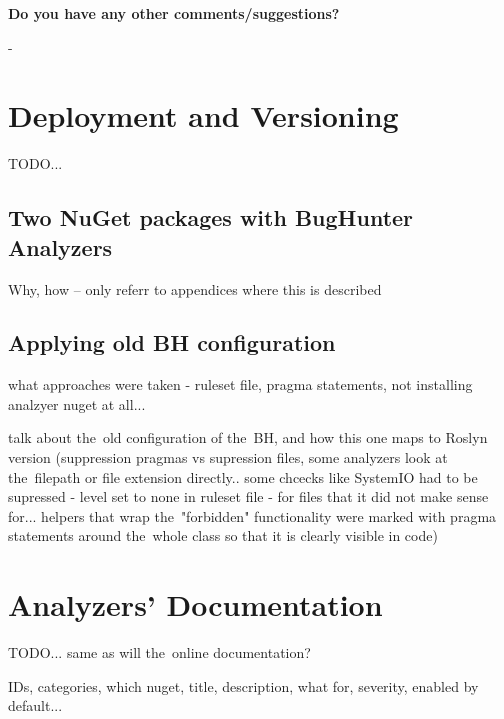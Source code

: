 \documentclass[
  digital, %
  table,   %
  lof,     %
  lot,     %
  oneside,
]{fithesis3}
\begin{document}
\smallskip\noindent
\textbf{Do you have any other comments/suggestions?}

-

\chapter{Deployment and Versioning}
\label{appendix:deployment}
TODO...
\section{Two NuGet packages with BugHunter Analyzers}
Why, how -- only referr to appendices where this is described

\section{Applying old BH configuration}
what approaches were taken - ruleset file, pragma statements, not installing analzyer nuget at all...

talk about the~old configuration of the~BH, and how this one maps to Roslyn version (suppression pragmas vs supression files, some analyzers look at the~filepath or file extension directly.. some chcecks like SystemIO had to be supressed - level set to none in ruleset file - for files that it did not make sense for... helpers that wrap the~"forbidden" functionality were marked with pragma statements around the~whole class so that it is clearly visible in code)

\chapter{Analyzers' Documentation}
TODO...
same as will the~online documentation?

IDs, categories, which nuget, title, description, what for, severity, enabled by default...
\end{document}

